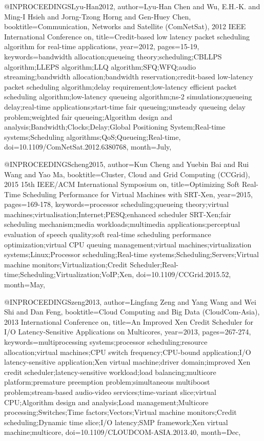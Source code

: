 @INPROCEEDINGS{Lyu-Han2012, 
author={Lyu-Han Chen and Wu, E.H.-K. and Ming-I Hsieh and Jorng-Tzong Horng and Gen-Huey Chen}, 
booktitle={Communication, Networks and Satellite (ComNetSat), 2012 IEEE International Conference on}, 
title={Credit-based low latency packet scheduling algorithm for real-time applications}, 
year={2012}, 
pages={15-19}, 
keywords={bandwidth allocation;queueing theory;scheduling;CBLLPS algorithm;LLEPS algorithm;LLQ algorithm;SFQ;WFQ;audio streaming;bandwidth allocation;bandwidth reservation;credit-based low-latency packet scheduling algorithm;delay requirement;low-latency efficient packet scheduling algorithm;low-latency queueing algorithm;ns-2 simulations;queueing delay;real-time applications;start-time fair queueing;unsteady queueing delay problem;weighted fair queueing;Algorithm design and analysis;Bandwidth;Clocks;Delay;Global Positioning System;Real-time systems;Scheduling algorithms;QoS;Queueing;Real-time}, 
doi={10.1109/ComNetSat.2012.6380768}, 
month={July},}

@INPROCEEDINGS{cheng2015, 
author={Kun Cheng and Yuebin Bai and Rui Wang and Yao Ma}, 
booktitle={Cluster, Cloud and Grid Computing (CCGrid), 2015 15th IEEE/ACM International Symposium on}, 
title={Optimizing Soft Real-Time Scheduling Performance for Virtual Machines with SRT-Xen}, 
year={2015}, 
pages={169-178}, 
keywords={processor scheduling;queueing theory;virtual machines;virtualisation;Internet;PESQ;enhanced scheduler SRT-Xen;fair scheduling mechanism;media workloads;multimedia applications;perceptual evaluation of speech quality;soft real-time scheduling performance optimization;virtual CPU queuing management;virtual machines;virtualization systems;Linux;Processor scheduling;Real-time systems;Scheduling;Servers;Virtual machine monitors;Virtualization;Credit Scheduler;Real-time;Scheduling;Virtualization;VoIP;Xen}, 
doi={10.1109/CCGrid.2015.52}, 
month={May},}

@INPROCEEDINGS{zeng2013, 
author={Lingfang Zeng and Yang Wang and Wei Shi and Dan Feng}, 
booktitle={Cloud Computing and Big Data (CloudCom-Asia), 2013 International Conference on}, 
title={An Improved Xen Credit Scheduler for I/O Latency-Sensitive Applications on Multicores}, 
year={2013}, 
pages={267-274}, 
keywords={multiprocessing systems;processor scheduling;resource allocation;virtual machines;CPU switch frequency;CPU-bound application;I/O latency-sensitive application;Xen virtual machine;driver domain;improved Xen credit scheduler;latency-sensitive workload;load balancing;multicore platform;premature preemption problem;simultaneous multiboost problem;stream-based audio-video services;time-variant slice;virtual CPU;Algorithm design and analysis;Load management;Multicore processing;Switches;Time factors;Vectors;Virtual machine monitors;Credit scheduling;Dynamic time slice;I/O latency;SMP framework;Xen virtual machine;multicore}, 
doi={10.1109/CLOUDCOM-ASIA.2013.40}, 
month={Dec},}

